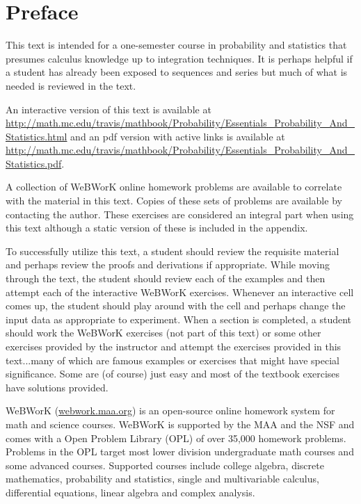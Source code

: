 \documentclass[10pt,]{book}
\numberwithin{equation}{section}
\begin{document}
\chapter*{Preface}\label{preface-1}
\hypertarget{p-4}{}%
This text is intended for a one-semester course in probability and statistics that presumes calculus knowledge up to integration techniques. It is perhaps helpful if a student has already been exposed to sequences and series but much of what is needed is reviewed in the text.%
\par
\hypertarget{p-5}{}%
An interactive version of this text is available at \href{http://math.mc.edu/travis/mathbook/Probability/Essentials_Probability_And_Statistics.html}{http://math.mc.edu/travis/mathbook/Probability/Essentials_Probability_And_Statistics.html} and an pdf version with active links is available at \href{http://math.mc.edu/travis/mathbook/Probability/Essentials_Probability_And_Statistics.pdf}{http://math.mc.edu/travis/mathbook/Probability/Essentials_Probability_And_Statistics.pdf}.%
\par
\hypertarget{p-6}{}%
A collection of WeBWorK online homework problems are available to correlate with the material in this text. Copies of these sets of problems are available by contacting the author. These exercises are considered an integral part when using this text although a static version of these is included in the appendix.%
\par
\hypertarget{p-7}{}%
To successfully utilize this text, a student should review the requisite material and perhaps review the proofs and derivations if appropriate. While moving through the text, the student should review each of the examples and then attempt each of the interactive WeBWorK exercises. Whenever an interactive cell comes up, the student should play around with the cell and perhaps change the input data as appropriate to experiment. When a section is completed, a student should work the WeBWorK exercises (not part of this text) or some other exercises provided by the instructor and attempt the exercises provided in this text...many of which are famous examples or exercises that might have special significance.  Some are (of course) just easy and most of the textbook exercises have solutions provided.%
\par
\hypertarget{p-8}{}%
WeBWorK (\href{http://webwork.maa.org}{webwork.maa.org}) is an open-source online homework system for math and science courses. WeBWorK is supported by the MAA and the NSF and comes with a Open Problem Library (OPL) of over 35,000 homework problems. Problems in the OPL target most lower division undergraduate math courses and some advanced courses. Supported courses include college algebra, discrete mathematics, probability and statistics, single and multivariable calculus, differential equations, linear algebra and complex analysis.%
\end{document}
